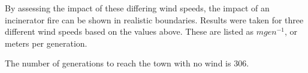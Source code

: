 \documentclass[11pt, a4paper, titlepage]{article}
\begin{document}
  By assessing the impact of these differing wind speeds, the impact of an incinerator fire can be shown in realistic boundaries. Results were taken for three different wind speeds based on the values above. These are listed as $mgen^{-1}$, or meters per generation.

  The number of generations to reach the town with no wind is 306.


  \begin{table}[h]
    \begin{center}



\end{center}
\end{table}
\end{document}
